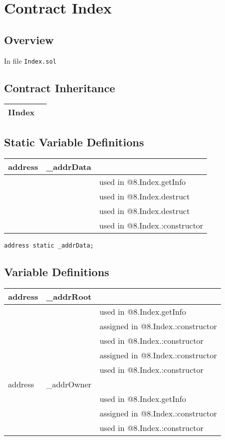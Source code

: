 
\chapter{Contract Index}

\minitoc

\section{Overview}


In file {\tt Index.sol}

\section{Contract Inheritance}


\noindent\begin{tabular}{|l|p{5cm}|}\hline
IIndex & \\\hline
\end{tabular}


\section{Static Variable Definitions}


\ifsoltables
\noindent\begin{tabular}{|l|l|p{5cm}|}\hline
address & \_{}addrData &  \\\hline
 & & used in @8.Index.getInfo\\\hline
 & & used in @8.Index.destruct\\\hline
 & & used in @8.Index.destruct\\\hline
 & & used in @8.Index.:constructor\\\hline
\end{tabular}
\fi




\begin{lstlisting}[firstnumber=11]
    address static _addrData;
\end{lstlisting}

\section{Variable Definitions}


\ifsoltables
\noindent\begin{tabular}{|l|l|p{5cm}|}\hline
address & \_{}addrRoot &  \\\hline
 & & used in @8.Index.getInfo\\\hline
 & & assigned in @8.Index.:constructor\\\hline
 & & used in @8.Index.:constructor\\\hline
 & & assigned in @8.Index.:constructor\\\hline
 & & used in @8.Index.:constructor\\\hline
address & \_{}addrOwner &  \\\hline
 & & used in @8.Index.getInfo\\\hline
 & & assigned in @8.Index.:constructor\\\hline
 & & used in @8.Index.:constructor\\\hline
\end{tabular}
\fi


